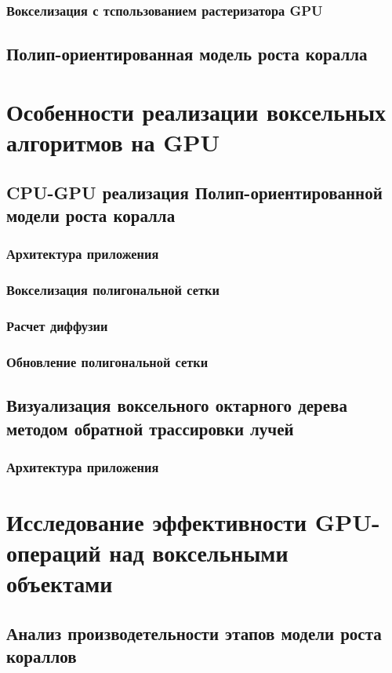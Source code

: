 \documentclass[a4paper,14pt]{extreport}
\begin{document}
\subsection{Вокселизация с тспользованием растеризатора GPU}
\section{Полип-ориентированная модель роста коралла}

\chapter{Особенности реализации воксельных алгоритмов на GPU}
\section{CPU-GPU реализация Полип-ориентированной модели роста коралла}
\subsection{Архитектура приложения}
\subsection{Вокселизация полигональной сетки}
\subsection{Расчет диффузии}
\subsection{Обновление полигональной сетки}
\section{Визуализация воксельного октарного дерева методом обратной трассировки лучей}
\subsection{Архитектура приложения}

\chapter{Исследование эффективности GPU-операций над воксельными объектами}
\section{Анализ производетельности этапов модели роста кораллов}
\end{document}
